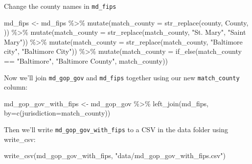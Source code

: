 \documentclass[
  letterpaper,
  DIV=11,
  numbers=noendperiod]{scrreprt}
\newenvironment{Shaded}{\begin{snugshade}}{\end{snugshade}}
\newcommand{\AttributeTok}[1]{\textcolor[rgb]{0.40,0.45,0.13}{#1}}
\newcommand{\FunctionTok}[1]{\textcolor[rgb]{0.28,0.35,0.67}{#1}}
\newcommand{\NormalTok}[1]{\textcolor[rgb]{0.00,0.23,0.31}{#1}}
\newcommand{\OtherTok}[1]{\textcolor[rgb]{0.00,0.23,0.31}{#1}}
\newcommand{\SpecialCharTok}[1]{\textcolor[rgb]{0.37,0.37,0.37}{#1}}
\newcommand{\StringTok}[1]{\textcolor[rgb]{0.13,0.47,0.30}{#1}}
\begin{document}
Change the county names in \texttt{md\_fips}

\begin{Shaded}
\begin{Highlighting}[]
\NormalTok{md\_fips }\OtherTok{\textless{}{-}}\NormalTok{ md\_fips }\SpecialCharTok{\%\textgreater{}\%} 
   \FunctionTok{mutate}\NormalTok{(}\AttributeTok{match\_county =} \FunctionTok{str\_replace}\NormalTok{(county, }\StringTok{\textquotesingle{} County\textquotesingle{}}\NormalTok{, }\StringTok{\textquotesingle{}\textquotesingle{}}\NormalTok{)) }\SpecialCharTok{\%\textgreater{}\%}
   \FunctionTok{mutate}\NormalTok{(}\AttributeTok{match\_county =} \FunctionTok{str\_replace}\NormalTok{(match\_county, }\StringTok{"St. Mary"}\NormalTok{, }\StringTok{"Saint Mary"}\NormalTok{)) }\SpecialCharTok{\%\textgreater{}\%} 
   \FunctionTok{mutate}\NormalTok{(}\AttributeTok{match\_county =} \FunctionTok{str\_replace}\NormalTok{(match\_county, }\StringTok{"Baltimore city"}\NormalTok{, }\StringTok{"Baltimore City"}\NormalTok{)) }\SpecialCharTok{\%\textgreater{}\%} 
   \FunctionTok{mutate}\NormalTok{(}\AttributeTok{match\_county =} \FunctionTok{if\_else}\NormalTok{(match\_county }\SpecialCharTok{==} \StringTok{"Baltimore"}\NormalTok{, }\StringTok{"Baltimore County"}\NormalTok{, match\_county))}
\end{Highlighting}
\end{Shaded}

Now we'll join \texttt{md\_gop\_gov} and \texttt{md\_fips} together
using our new \texttt{match\_county} column:

\begin{Shaded}
\begin{Highlighting}[]
\NormalTok{md\_gop\_gov\_with\_fips }\OtherTok{\textless{}{-}}\NormalTok{ md\_gop\_gov }\SpecialCharTok{\%\textgreater{}\%}
  \FunctionTok{left\_join}\NormalTok{(md\_fips, }\AttributeTok{by=}\FunctionTok{c}\NormalTok{(}\StringTok{\textquotesingle{}jurisdiction\textquotesingle{}}\OtherTok{=}\StringTok{\textquotesingle{}match\_county\textquotesingle{}}\NormalTok{))}
\end{Highlighting}
\end{Shaded}

Then we'll write \texttt{md\_gop\_gov\_with\_fips} to a CSV in the data
folder using write\_csv:

\begin{Shaded}
\begin{Highlighting}[]
\FunctionTok{write\_csv}\NormalTok{(md\_gop\_gov\_with\_fips, }\StringTok{"data/md\_gop\_gov\_with\_fips.csv"}\NormalTok{)}
\end{Highlighting}
\end{Shaded}
\end{document}

